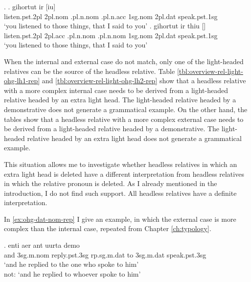 \ex.
\ag. gihortut ir [iu]    \\
 listen.\ac{pst}.2\ac{pl}\scsub{[acc]} 2\ac{pl}.\ac{nom} .\ac{pl}.\ac{n}.\ac{nom} .\ac{pl}.\ac{n}.\ac{acc} 1\ac{sg}.\ac{nom} 2\ac{pl}.\ac{dat} speak.\ac{pst}.1\ac{sg}\scsub{[acc]}\\
 `you listened to those things, that I said to you' \label{ex:ohg-acc-acc-rep-elh}
\bg. gihortut ir thiu []   \\
 listen.\ac{pst}.2\ac{pl}\scsub{[acc]} 2\ac{pl}.\ac{acc} .\ac{pl}.\ac{n}.\ac{nom} .\ac{pl}.\ac{n}.\ac{nom} 1\ac{sg}.\ac{nom} 2\ac{pl}.\ac{dat} speak.\ac{pst}.1\ac{sg}\scsub{[acc]}\\
 `you listened to those things, that I said to you' \label{ex:ohg-acc-acc-rep-lh}

When the internal and external case do not match, only one of the light-headed relatives can be the source of the headless relative.
Table \ref{tbl:overview-rel-light-ohg-lh1-rep} and \ref{tbl:overview-rel-light-ohg-lh2-rep} show that a headless relative with a more complex internal case needs to be derived from a light-headed relative headed by an extra light head. The light-headed relative headed by a demonstrative does not generate a grammatical example.
On the other hand, the tables show that a headless relative with a more complex external case needs to be derived from a light-headed relative headed by a demonstrative. The light-headed relative headed by an extra light head does not generate a grammatical example.

This situation allows me to investigate whether headless relatives in which an extra light head is deleted have a different interpretation from headless relatives in which the relative pronoun is deleted. As I already mentioned in the introduction, I do not find such support. All headless relatives have a definite interpretation.

In \ref{ex:ohg-dat-nom-rep} I give an example, in which the external case is more complex than the internal case, repeated from Chapter \ref{ch:typology}.

\exg. enti aer {ant uurta} demo  \\
and 3\ac{sg}.\ac{m}.\ac{nom} reply.\ac{pst}.3\ac{sg}\scsub{[dat]} \ac{rp}.\ac{sg}.\ac{m}.\ac{dat} {to 3\ac{sg}.\ac{m}.\ac{dat}} speak.\ac{pst}.3\ac{sg}\scsub{[nom]}\\
`and he replied to the one who spoke to him'\\
not: `and he replied to whoever spoke to him'
 \label{ex:ohg-dat-nom-rep}

